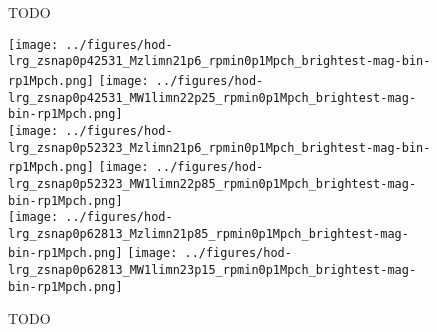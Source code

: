 \documentclass[twocolumn,apj,iop,tighten]{emulateapj2}
\begin{document}
\begin{figure*}
\caption{TODO
}
\label{fig:lrg_wp}
\end{figure*}



\begin{figure*}
\centering
\texttt{[image: ../figures/hod-lrg\_zsnap0p42531\_Mzlimn21p6\_rpmin0p1Mpch\_brightest-mag-bin-rp1Mpch.png]}
\texttt{[image: ../figures/hod-lrg\_zsnap0p42531\_MW1limn22p25\_rpmin0p1Mpch\_brightest-mag-bin-rp1Mpch.png]}
\\
\texttt{[image: ../figures/hod-lrg\_zsnap0p52323\_Mzlimn21p6\_rpmin0p1Mpch\_brightest-mag-bin-rp1Mpch.png]}
\texttt{[image: ../figures/hod-lrg\_zsnap0p52323\_MW1limn22p85\_rpmin0p1Mpch\_brightest-mag-bin-rp1Mpch.png]}
\\
\texttt{[image: ../figures/hod-lrg\_zsnap0p62813\_Mzlimn21p85\_rpmin0p1Mpch\_brightest-mag-bin-rp1Mpch.png]}
\texttt{[image: ../figures/hod-lrg\_zsnap0p62813\_MW1limn23p15\_rpmin0p1Mpch\_brightest-mag-bin-rp1Mpch.png]}
\caption{TODO
}
\label{fig:lrg_hod}
\end{figure*}
\end{document}
